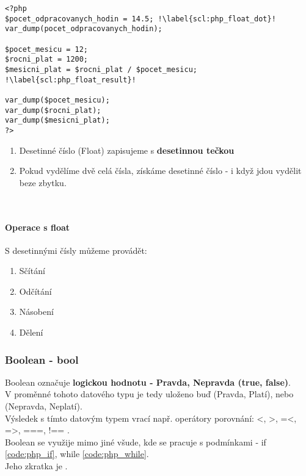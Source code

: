 \begin{minipage}[t]{.45\textwidth}
\begin{code}
\begin{verbatim}
<?php 
$pocet_odpracovanych_hodin = 14.5; !\label{scl:php_float_dot}!
var_dump(pocet_odpracovanych_hodin);

$pocet_mesicu = 12;
$rocni_plat = 1200;
$mesicni_plat = $rocni_plat / $pocet_mesicu; !\label{scl:php_float_result}!

var_dump($pocet_mesicu);
var_dump($rocni_plat);
var_dump($mesicni_plat);
?>
\end{verbatim}

\label{code:typy_float}
\end{code}
\end{minipage}
\begin{minipage}[t]{.45\textwidth}
\begin{enumerate}
\item[ř. \ref{scl:php_float_dot}:] Desetinné číslo (Float) zapisujeme s \textbf{desetinnou tečkou}
\item[ř. \ref{scl:php_float_result}:] Pokud vydělíme dvě celá čísla, získáme desetinné číslo - i když jdou vydělit beze zbytku.
\end{enumerate}
\end{minipage}\\ 

\paragraph{Operace s float}
S desetinnými čísly můžeme provádět:
\begin{enumerate}
\item[+] Sčítání
\item[-] Odčítání
\item[*] Násobení
\item[/] Dělení
\end{enumerate}

\subsubsection{Boolean - bool}
Boolean označuje \textbf{logickou hodnotu - Pravda, Nepravda (true, false)}.\\
V proměnné tohoto datového typu je tedy uloženo buď  (Pravda, Platí), nebo  (Nepravda, Neplatí).\\
Výsledek s tímto datovým typem vrací např. operátory porovnání: <, >, =<, =>, ===, !== .\\
Boolean se využije mimo jiné všude, kde se pracuje s podmínkami - if \ref{code:php_if}, while \ref{code:php_while}.\\
Jeho zkratka je .\\

